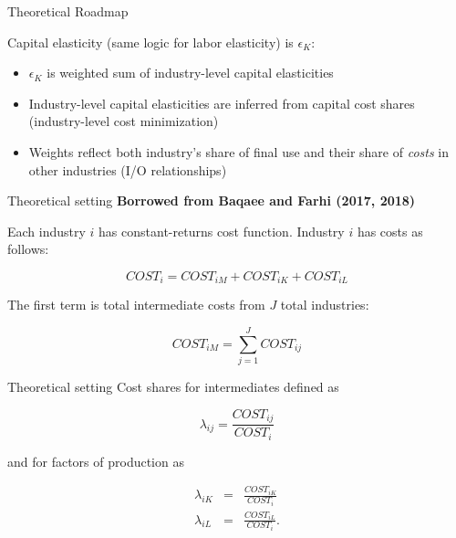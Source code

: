 \documentclass[10pt,xcolor=dvipsnames]{beamer}
\begin{document}
\begin{frame}{Theoretical Roadmap}

Capital elasticity (same logic for labor elasticity) is $\epsilon_K$:
\begin{itemize}
  \item $\epsilon_K$ is weighted sum of industry-level capital elasticities
  \item Industry-level capital elasticities are inferred from capital cost shares (industry-level cost minimization)
  \item Weights reflect both industry's share of final use and their share of \textit{costs} in other industries (I/O relationships)
\end{itemize}
\end{frame}

\begin{frame}{Theoretical setting}
\textbf{Borrowed from Baqaee and Farhi (2017, 2018)}
\vspace{.25in}

Each industry $i$ has constant-returns cost function. Industry $i$ has costs as follows:

\begin{equation}
  COST_i = COST_{iM} + COST_{iK} + COST_{iL}
\end{equation}

The first term is total intermediate costs from $J$ total industries:

\begin{equation}
  COST_{iM} = \sum_{j=1}^{J} COST_{ij}
\end{equation}

\end{frame}

\begin{frame}{Theoretical setting}
Cost shares for intermediates defined as

\begin{equation}
  \lambda_{ij} = \frac{COST_{ij}}{COST_i}
\end{equation}

and for factors of production as 

\begin{eqnarray}
  \lambda_{iK} &=& \frac{COST_{iK}}{COST_i} \\
  \lambda_{iL} &=& \frac{COST_{iL}}{COST_i}.
\end{eqnarray}

\end{frame}
\end{document}
